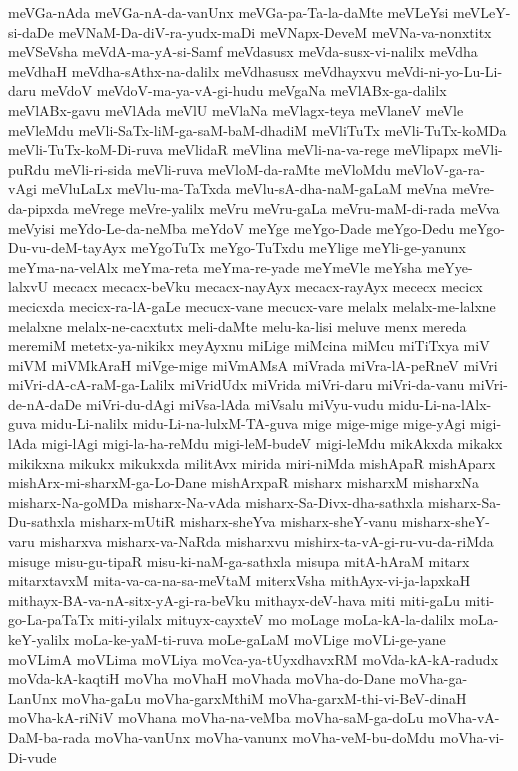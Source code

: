 {meVGa-nAda
meVGa-nA-da-vanUnx
meVGa-pa-Ta-la-daMte
meVLeYsi
meVLeY-si-daDe
meVNaM-Da-diV-ra-yudx-maDi
meVNapx-DeveM
meVNa-va-nonxtitx
meVSeVsha
meVdA-ma-yA-si-Samf
meVdasusx
meVda-susx-vi-nalilx
meVdha
meVdhaH
meVdha-sAthx-na-dalilx
meVdhasusx
meVdhayxvu
meVdi-ni-yo-Lu-Li-daru
meVdoV
meVdoV-ma-ya-vA-gi-hudu
meVgaNa
meVlABx-ga-dalilx
meVlABx-gavu
meVlAda
meVlU
meVlaNa
meVlagx-teya
meVlaneV
meVle
meVleMdu
meVli-SaTx-liM-ga-saM-baM-dhadiM
meVliTuTx
meVli-TuTx-koMDa
meVli-TuTx-koM-Di-ruva
meVlidaR
meVlina
meVli-na-va-rege
meVlipapx
meVli-puRdu
meVli-ri-sida
meVli-ruva
meVloM-da-raMte
meVloMdu
meVloV-ga-ra-vAgi
meVluLaLx
meVlu-ma-TaTxda
meVlu-sA-dha-naM-gaLaM
meVna
meVre-da-pipxda
meVrege
meVre-yalilx
meVru
meVru-gaLa
meVru-maM-di-rada
meVva
meVyisi
meYdo-Le-da-neMba
meYdoV
meYge
meYgo-Dade
meYgo-Dedu
meYgo-Du-vu-deM-tayAyx
meYgoTuTx
meYgo-TuTxdu
meYlige
meYli-ge-yanunx
meYma-na-velAlx
meYma-reta
meYma-re-yade
meYmeVle
meYsha
meYye-lalxvU
mecacx
mecacx-beVku
mecacx-nayAyx
mecacx-rayAyx
mececx
mecicx
mecicxda
mecicx-ra-lA-gaLe
mecucx-vane
mecucx-vare
melalx
melalx-me-lalxne
melalxne
melalx-ne-cacxtutx
meli-daMte
melu-ka-lisi
meluve
menx
mereda
meremiM
metetx-ya-nikikx
meyAyxnu
miLige
miMcina
miMcu
miTiTxya
miV
miVM
miVMkAraH
miVge-mige
miVmAMsA
miVrada
miVra-lA-peRneV
miVri
miVri-dA-cA-raM-ga-Lalilx
miVridUdx
miVrida
miVri-daru
miVri-da-vanu
miVri-de-nA-daDe
miVri-du-dAgi
miVsa-lAda
miVsalu
miVyu-vudu
midu-Li-na-lAlx-guva
midu-Li-nalilx
midu-Li-na-lulxM-TA-guva
mige
mige-mige
mige-yAgi
migi-lAda
migi-lAgi
migi-la-ha-reMdu
migi-leM-budeV
migi-leMdu
mikAkxda
mikakx
mikikxna
mikukx
mikukxda
militAvx
mirida
miri-niMda
mishApaR
mishAparx
mishArx-mi-sharxM-ga-Lo-Dane
mishArxpaR
misharx
misharxM
misharxNa
misharx-Na-goMDa
misharx-Na-vAda
misharx-Sa-Divx-dha-sathxla
misharx-Sa-Du-sathxla
misharx-mUtiR
misharx-sheYva
misharx-sheY-vanu
misharx-sheY-varu
misharxva
misharx-va-NaRda
misharxvu
mishirx-ta-vA-gi-ru-vu-da-riMda
misuge
misu-gu-tipaR
misu-ki-naM-ga-sathxla
misupa
mitA-hAraM
mitarx
mitarxtavxM
mita-va-ca-na-sa-meVtaM
miterxVsha
mithAyx-vi-ja-lapxkaH
mithayx-BA-va-nA-sitx-yA-gi-ra-beVku
mithayx-deV-hava
miti
miti-gaLu
miti-go-La-paTaTx
miti-yilalx
mituyx-cayxteV
mo
moLage
moLa-kA-la-dalilx
moLa-keY-yalilx
moLa-ke-yaM-ti-ruva
moLe-gaLaM
moVLige
moVLi-ge-yane
moVLimA
moVLima
moVLiya
moVca-ya-tUyxdhavxRM
moVda-kA-kA-radudx
moVda-kA-kaqtiH
moVha
moVhaH
moVhada
moVha-do-Dane
moVha-ga-LanUnx
moVha-gaLu
moVha-garxMthiM
moVha-garxM-thi-vi-BeV-dinaH
moVha-kA-riNiV
moVhana
moVha-na-veMba
moVha-saM-ga-doLu
moVha-vA-DaM-ba-rada
moVha-vanUnx
moVha-vanunx
moVha-veM-bu-doMdu
moVha-vi-Di-vude
}
